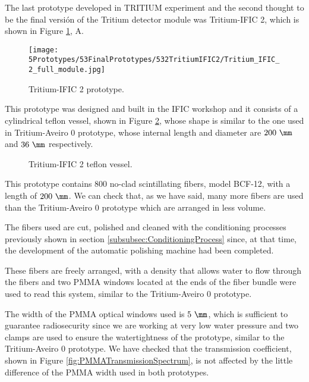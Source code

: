 The last prototype developed in TRITIUM experiment and the second thought to be the final versión of the Tritium detector module was Tritium-IFIC 2, which is shown in Figure \ref{fig:TritiumIFIC2}, A.

\begin{figure}[h]
\centering
\texttt{[image: 5Prototypes/53FinalPrototypes/532TritiumIFIC2/Tritium\_IFIC\_2\_full\_module.jpg]}
\caption{Tritium-IFIC 2 prototype.\label{fig:TritiumIFIC2}}
\end{figure}

This prototype was designed and built in the IFIC workshop and it consists of a cylindrical teflon vessel, shown in Figure \ref{fig:Tritium-IFIC2_vessels}, whose shape is similar to the one used in Tritium-Aveiro 0 prototype, whose internal length and diameter are $200~\mm$ and $36~\mm$ respectively.

\begin{figure}[h]
 \centering
 \caption{Tritium-IFIC 2 teflon vessel.}
 \label{fig:Tritium-IFIC2_vessels}
\end{figure}

This prototype contains $800$ no-clad scintillating fibers, model BCF-12, with a length of $200~\mm$. We can check that, as we have said, many more fibers are used than the Tritium-Aveiro 0 prototype which are arranged in less volume.

The fibers used are cut, polished and cleaned with the conditioning processes previously shown in section \ref{subsubsec:ConditioningProcess} since, at that time, the development of the automatic polishing machine had been completed.

These fibers are freely arranged, with a density that allows water to flow through the fibers and two PMMA windows located at the ends of the fiber bundle were used to read this system, similar to the Tritium-Aveiro 0 prototype. 

The width of the PMMA optical windows used is $5~\mm$, which is sufficient to guarantee radiosecurity since we are working at very low water pressure  and two clamps are used to ensure the watertightness of the prototype, similar to the Tritium-Aveiro 0 prototype. We have checked that the transmission coefficient, shown in Figure \ref{fig:PMMATransmissionSpectrum}, is not affected by the little difference of the PMMA width used in both prototypes.

